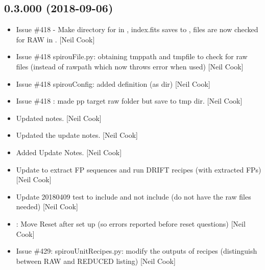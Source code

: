 \documentclass[a4paper,10pt,english]{report}
\begin{document}
\subsection{0.3.000 (2018-09-06)}
\label{\detokenize{misc/changelog:id333}}\begin{itemize}
\item {} 
Issue \#418  - Make directory for  in
, index.fits saves to , files are now checked for RAW in
. {[}Neil Cook{]}

\item {} 
Issue \#418 spirouFile.py: obtaining tmppath and tmpfile to check for
raw files (instead of rawpath which now throws error when used) {[}Neil
Cook{]}

\item {} 
Issue \#418 spirouConfig: added  definition (as 
dir) {[}Neil Cook{]}

\item {} 
Issue \#418 : made pp target raw folder but
save to tmp dir. {[}Neil Cook{]}

\item {} 
Updated notes. {[}Neil Cook{]}

\item {} 
Updated the update notes. {[}Neil Cook{]}

\item {} 
Added Update Notes. {[}Neil Cook{]}

\item {} 
Update  to extract FP sequences and run DRIFT
recipes (with extracted FPs) {[}Neil Cook{]}

\item {} 
Update 20180409 test to include  and not include
 (do not have the raw files needed) {[}Neil Cook{]}

\item {} 
: Move Reset after set up (so errors reported before reset
questions) {[}Neil Cook{]}

\item {} 
Issue \#429: spirouUnitRecipes.py: modify the outputs of 
recipes (distinguish between RAW and REDUCED listing) {[}Neil Cook{]}


\end{itemize}
\end{document}

